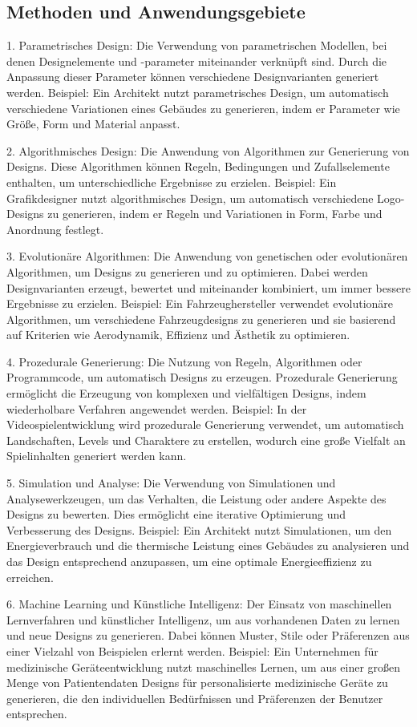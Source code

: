 \subsection*{Methoden und Anwendungsgebiete}
1. Parametrisches Design: Die Verwendung von parametrischen Modellen, bei denen Designelemente und -parameter miteinander verknüpft sind. Durch die Anpassung dieser Parameter können verschiedene Designvarianten generiert werden. Beispiel: Ein Architekt nutzt parametrisches Design, um automatisch verschiedene Variationen eines Gebäudes zu generieren, indem er Parameter wie Größe, Form und Material anpasst.

2. Algorithmisches Design: Die Anwendung von Algorithmen zur Generierung von Designs. Diese Algorithmen können Regeln, Bedingungen und Zufallselemente enthalten, um unterschiedliche Ergebnisse zu erzielen. Beispiel: Ein Grafikdesigner nutzt algorithmisches Design, um automatisch verschiedene Logo-Designs zu generieren, indem er Regeln und Variationen in Form, Farbe und Anordnung festlegt.

3. Evolutionäre Algorithmen: Die Anwendung von genetischen oder evolutionären Algorithmen, um Designs zu generieren und zu optimieren. Dabei werden Designvarianten erzeugt, bewertet und miteinander kombiniert, um immer bessere Ergebnisse zu erzielen. Beispiel: Ein Fahrzeughersteller verwendet evolutionäre Algorithmen, um verschiedene Fahrzeugdesigns zu generieren und sie basierend auf Kriterien wie Aerodynamik, Effizienz und Ästhetik zu optimieren.

4. Prozedurale Generierung: Die Nutzung von Regeln, Algorithmen oder Programmcode, um automatisch Designs zu erzeugen. Prozedurale Generierung ermöglicht die Erzeugung von komplexen und vielfältigen Designs, indem wiederholbare Verfahren angewendet werden. Beispiel: In der Videospielentwicklung wird prozedurale Generierung verwendet, um automatisch Landschaften, Levels und Charaktere zu erstellen, wodurch eine große Vielfalt an Spielinhalten generiert werden kann.

5. Simulation und Analyse: Die Verwendung von Simulationen und Analysewerkzeugen, um das Verhalten, die Leistung oder andere Aspekte des Designs zu bewerten. Dies ermöglicht eine iterative Optimierung und Verbesserung des Designs. Beispiel: Ein Architekt nutzt Simulationen, um den Energieverbrauch und die thermische Leistung eines Gebäudes zu analysieren und das Design entsprechend anzupassen, um eine optimale Energieeffizienz zu erreichen.

6. Machine Learning und Künstliche Intelligenz: Der Einsatz von maschinellen Lernverfahren und künstlicher Intelligenz, um aus vorhandenen Daten zu lernen und neue Designs zu generieren. Dabei können Muster, Stile oder Präferenzen aus einer Vielzahl von Beispielen erlernt werden. Beispiel: Ein Unternehmen für medizinische Geräteentwicklung nutzt maschinelles Lernen, um aus einer großen Menge von Patientendaten Designs für personalisierte medizinische Geräte zu generieren, die den individuellen Bedürfnissen und Präferenzen der Benutzer entsprechen.

